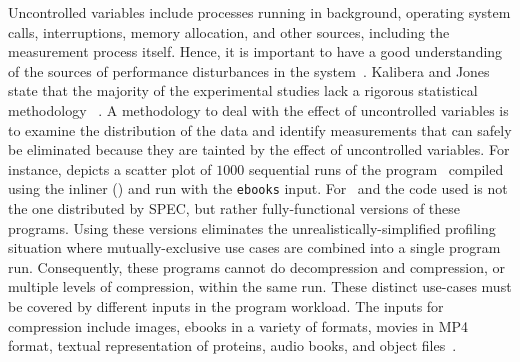 Uncontrolled variables include processes running in background, operating system calls, interruptions, memory allocation, and other sources, including the measurement process itself. Hence, it is important to have a good understanding of the sources of performance disturbances in  the system~\cite{Kalibera2013}.
Kalibera and Jones state that the majority of the experimental studies lack a rigorous statistical methodology~ \cite{Kalibera2013}. A methodology to deal with the effect of uncontrolled variables is to examine the distribution of the data and identify measurements that can safely be eliminated because they are tainted by the effect of uncontrolled variables. For instance,  depicts a scatter plot of $1000$ sequential runs of the program \bzip\  compiled using the  inliner (\llvm) and run with the {\tt ebooks} input. For \bzip\ and \gzip the code used is not the one distributed by SPEC, but rather fully-functional versions of these programs. Using these versions eliminates the unrealistically-simplified profiling situation where mutually-exclusive use cases are combined into a single program run. Consequently, these programs cannot do decompression and compression, or multiple levels of compression, within the same run.  These distinct use-cases must be covered by different inputs in the program workload.
The inputs for compression include images, ebooks in a variety of formats, movies in MP4 format, textual representation of proteins, audio books, and object files~\cite{BerubePhD}.





